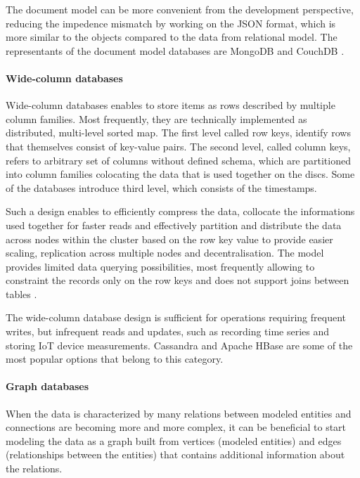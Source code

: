 The document model can be more convenient from the development perspective, reducing the impedence mismatch by working on the JSON format, which is more similar to the objects compared to the data from relational model. The representants of the document model databases are MongoDB \cite{MongoDB} and CouchDB \cite{CouchDB}.

\paragraph{Wide-column databases}

Wide-column databases enables to store items as rows described by multiple column families. Most frequently, they are technically implemented as distributed, multi-level sorted map. The first level called row keys, identify rows that themselves consist of key-value pairs. The second level, called column keys, refers to arbitrary set of columns without defined schema, which are partitioned into column families colocating the data that is used together on the discs. Some of the databases introduce third level, which consists of the timestamps.

Such a design enables to efficiently compress the data, collocate the informations used together for faster reads and effectively partition and distribute the data across nodes within the cluster based on the row key value to provide easier scaling, replication across multiple nodes and decentralisation. The model provides limited data querying possibilities, most frequently allowing to constraint the records only on the row keys and does not support joins between tables \cite{NoSQLDatabaseSystemsSurveyDecisionGuidance}.

The wide-column database design is sufficient for operations requiring frequent writes, but infrequent reads and updates, such as recording time series and storing IoT device measurements. Cassandra \cite{Cassandra} and Apache HBase \cite{HBase} are some of the most popular options that belong to this category.

\paragraph{Graph databases}

When the data is characterized by many relations between modeled entities and connections are becoming more and more complex, it can be beneficial to start modeling the data as a graph built from vertices (modeled entities) and edges (relationships between the entities) that contains additional information about the relations. 

